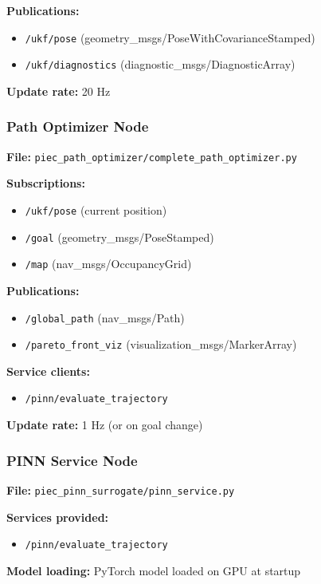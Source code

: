 \textbf{Publications:}
\begin{itemize}
    \item \texttt{/ukf/pose} (geometry\_msgs/PoseWithCovarianceStamped)
    \item \texttt{/ukf/diagnostics} (diagnostic\_msgs/DiagnosticArray)
\end{itemize}

\textbf{Update rate:} 20 Hz

\subsubsection{Path Optimizer Node}

\textbf{File:} \texttt{piec\_path\_optimizer/complete\_path\_optimizer.py}

\textbf{Subscriptions:}
\begin{itemize}
    \item \texttt{/ukf/pose} (current position)
    \item \texttt{/goal} (geometry\_msgs/PoseStamped)
    \item \texttt{/map} (nav\_msgs/OccupancyGrid)
\end{itemize}

\textbf{Publications:}
\begin{itemize}
    \item \texttt{/global\_path} (nav\_msgs/Path)
    \item \texttt{/pareto\_front\_viz} (visualization\_msgs/MarkerArray)
\end{itemize}

\textbf{Service clients:}
\begin{itemize}
    \item \texttt{/pinn/evaluate\_trajectory}
\end{itemize}

\textbf{Update rate:} 1 Hz (or on goal change)

\subsubsection{PINN Service Node}

\textbf{File:} \texttt{piec\_pinn\_surrogate/pinn\_service.py}

\textbf{Services provided:}
\begin{itemize}
    \item \texttt{/pinn/evaluate\_trajectory}
\end{itemize}

\textbf{Model loading:} PyTorch model loaded on GPU at startup

